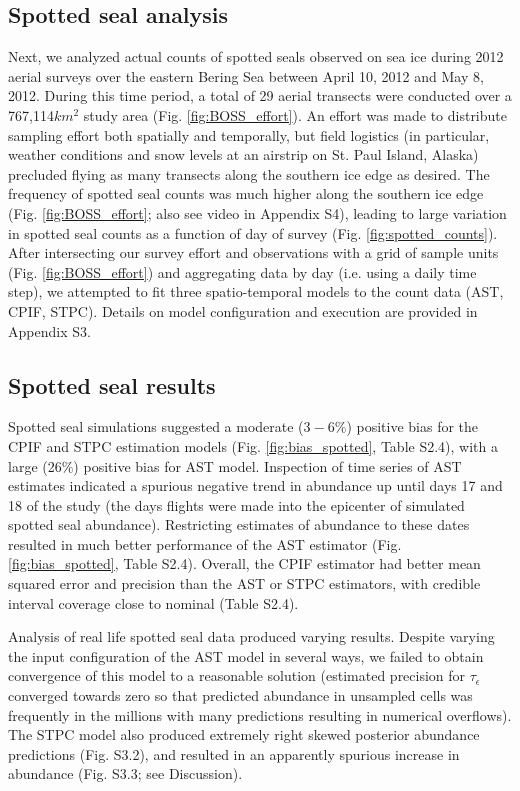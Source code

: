 \documentclass[12pt,english]{article}
\begin{document}
\begin{spacing}{1.9}
\subsection{Spotted seal analysis}

Next, we analyzed actual counts of spotted seals observed on sea ice during 2012 aerial surveys over the eastern Bering Sea between April 10, 2012 and May 8, 2012.  During this time period, a total of 29 aerial transects were conducted over a 767,114$km^2$ study area (Fig. \ref{fig:BOSS_effort}).  An effort was made to distribute sampling effort both spatially and temporally, but field logistics (in particular, weather conditions and snow levels at an airstrip on St. Paul Island, Alaska) precluded flying as many transects along the southern ice edge as desired.  The frequency of spotted seal counts was much higher along the southern ice edge (Fig. \ref{fig:BOSS_effort}; also see video in Appendix S4), leading to large variation in spotted seal counts as a function of day of survey (Fig. \ref{fig:spotted_counts}).  After intersecting our survey effort and observations with a grid of sample units (Fig. \ref{fig:BOSS_effort}) and aggregating data by day (i.e. using a daily time step), we attempted to fit three spatio-temporal models to the count data (AST, CPIF, STPC).  Details on model configuration and execution are provided in Appendix S3.

\subsection{Spotted seal results}

Spotted seal simulations suggested a moderate ($3-6\%$) positive bias for the CPIF and STPC estimation models (Fig. \ref{fig:bias_spotted}, Table S2.4), with a large (26\%) positive bias for AST model.  Inspection of time series of AST estimates indicated a spurious negative trend in abundance up until days 17 and 18 of the study (the days flights were made into the epicenter of simulated spotted seal abundance).  Restricting estimates of abundance to these dates resulted in much better performance of the AST estimator (Fig. \ref{fig:bias_spotted}, Table S2.4).  Overall, the CPIF estimator had better mean squared error and precision than the AST or STPC estimators, with credible interval coverage close to nominal (Table S2.4).

Analysis of real life spotted seal data produced varying results.  Despite varying the input configuration of the AST model in several ways, we failed to obtain convergence of this model to a reasonable solution (estimated precision for $\tau_\epsilon$ converged towards zero so that predicted abundance in unsampled cells was frequently in the millions with many predictions resulting in numerical overflows). The STPC model also produced extremely right skewed posterior abundance predictions (Fig. S3.2), and resulted in an apparently spurious increase in abundance (Fig. S3.3; see Discussion).


\end{spacing}
\end{document}
